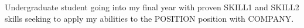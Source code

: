 
\begin{cvparagraph}

Undergraduate student going into my final year with proven SKILL1 and SKILL2 skills
seeking to apply my abilities to the POSITION position with COMPANY.

\end{cvparagraph}
